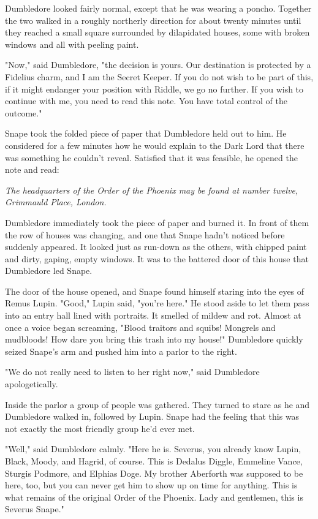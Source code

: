 Dumbledore looked fairly normal, except that he was wearing a poncho. Together the two walked in a roughly northerly direction for about twenty minutes until they reached a small square surrounded by dilapidated houses, some with broken windows and all with peeling paint.

"Now," said Dumbledore, "the decision is yours. Our destination is protected by a Fidelius charm, and I am the Secret Keeper. If you do not wish to be part of this, if it might endanger your position with Riddle, we go no further. If you wish to continue with me, you need to read this note. You have total control of the outcome."

Snape took the folded piece of paper that Dumbledore held out to him. He considered for a few minutes how he would explain to the Dark Lord that there was something he couldn't reveal. Satisfied that it was feasible, he opened the note and read:

\emph{The headquarters of the Order of the Phoenix may be found at number twelve, Grimmauld Place, London.}

Dumbledore immediately took the piece of paper and burned it. In front of them the row of houses was changing, and one that Snape hadn't noticed before suddenly appeared. It looked just as run-down as the others, with chipped paint and dirty, gaping, empty windows. It was to the battered door of this house that Dumbledore led Snape.

The door of the house opened, and Snape found himself staring into the eyes of Remus Lupin. "Good," Lupin said, "you're here." He stood aside to let them pass into an entry hall lined with portraits. It smelled of mildew and rot. Almost at once a voice began screaming, "Blood traitors and squibs! Mongrels and mudbloods! How dare you bring this trash into my house!" Dumbledore quickly seized Snape's arm and pushed him into a parlor to the right.

"We do not really need to listen to her right now," said Dumbledore apologetically.

Inside the parlor a group of people was gathered. They turned to stare as he and Dumbledore walked in, followed by Lupin. Snape had the feeling that this was not exactly the most friendly group he'd ever met.

"Well," said Dumbledore calmly. "Here he is. Severus, you already know Lupin, Black, Moody, and Hagrid, of course. This is Dedalus Diggle, Emmeline Vance, Sturgis Podmore, and Elphias Doge. My brother Aberforth was supposed to be here, too, but you can never get him to show up on time for anything. This is what remains of the original Order of the Phoenix. Lady and gentlemen, this is Severus Snape."

